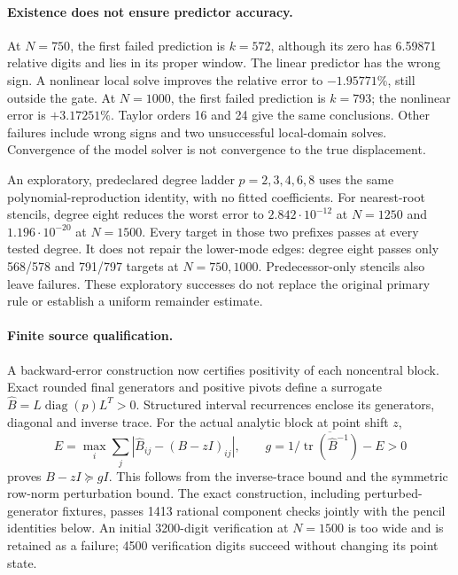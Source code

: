 \paragraph{Existence does not ensure predictor accuracy.}
At $N=750$, the first failed prediction is $k=572$, although its zero
has 6.59871 relative digits and lies in its proper window. The linear
predictor has the wrong sign. A nonlinear local solve improves the
relative error to $-1.95771\%$, still outside the gate. At $N=1000$,
the first failed prediction is $k=793$; the nonlinear error is
$+3.17251\%$. Taylor orders 16 and 24 give the same conclusions.
Other failures include wrong signs and two unsuccessful local-domain
solves. Convergence of the model solver is not convergence to the true
displacement.

An exploratory, predeclared degree ladder $p=2,3,4,6,8$ uses the same
polynomial-reproduction identity, with no fitted coefficients. For
nearest-root stencils, degree eight reduces the worst error to
$2.842\cdot10^{-12}$ at $N=1250$ and $1.196\cdot10^{-20}$ at $N=1500$.
Every target in those two prefixes passes at every tested degree.
It does not repair the lower-mode edges: degree eight passes only
568/578 and 791/797 targets at $N=750,1000$. Predecessor-only stencils
also leave failures. These exploratory successes do not replace the
original primary rule or establish a uniform remainder estimate.

\paragraph{Finite source qualification.}
A backward-error construction now certifies positivity of each
noncentral block. Exact rounded final generators and positive pivots
define a surrogate $\widehat B=L\operatorname{diag}(p)L^T>0$.
Structured interval recurrences enclose its generators, diagonal and
inverse trace. For the actual analytic block at point shift $z$,
\[
 E=\max_i\sum_j|\widehat B_{ij}-(B-zI)_{ij}|,\qquad
 g=1/\overline{\operatorname{tr}(\widehat B^{-1})}-E>0
\]
proves $B-zI\succeq gI$. This follows from the inverse-trace bound and
the symmetric row-norm perturbation bound. The exact construction,
including perturbed-generator fixtures, passes 1413 rational component
checks jointly with the pencil identities below. An initial 3200-digit
verification at $N=1500$ is too wide and is retained as a failure;
4500 verification digits succeed without changing its point state.

